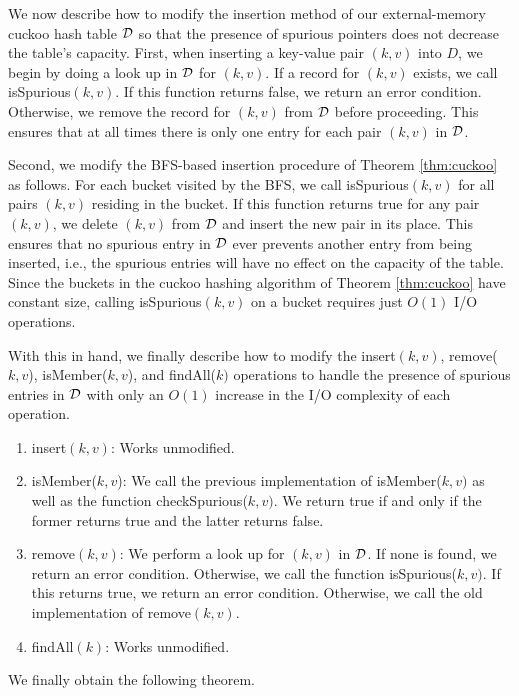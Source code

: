 \documentclass[11pt,letterpaper]{article}
\begin{document}
We now describe how to modify the insertion method of our external-memory cuckoo hash table $\cal D$ so that the presence of spurious pointers does not decrease 
the table's capacity. First, when inserting a key-value pair $(k,v)$ into $D$, we begin by doing a look up in $\cal D$ for $(k, v)$. If a record for $(k, v)$ exists, we call isSpurious$(k,v)$. If this function returns false, we return an error condition. Otherwise, we remove the record for $(k,v)$ from $\cal D$ before proceeding.   This ensures that at all times there is only one entry for each pair $(k,v)$ in $\cal D$.

Second, we modify the BFS-based insertion procedure of Theorem \ref{thm:cuckoo} as follows. For each bucket visited by the BFS, we 
call isSpurious$(k,v)$ for all pairs $(k,v)$ residing in the bucket. If this function returns true for any pair $(k,v)$, we delete $(k,v)$ from $\cal D$ and
insert the new pair in its place. This ensures that no spurious entry in $\cal D$ ever prevents another entry from
being inserted, i.e., the spurious entries will have no effect on the capacity of the table. Since the buckets in the cuckoo hashing algorithm of Theorem \ref{thm:cuckoo} have constant size, calling isSpurious$(k,v)$ on a
bucket requires just $O(1)$ I/O operations.

With this in hand, we finally describe how to modify the insert$(k,v)$, remove($k, v$), isMember($k, v$), and findAll($k)$ operations
to handle the presence of spurious entries in $\cal D$ with only an $O(1)$ increase in the I/O complexity of each operation.

\begin{enumerate}
\item
insert$(k,v)$: Works unmodified.
\item isMember($k,v$): We call the previous implementation of isMember($k,v)$ as well as the function checkSpurious($k,v)$. We return true if and only if the former
returns true and the latter returns false.
\item remove$(k,v)$:  We 
perform a look up for $(k,v)$ in $\cal D$. If none is found, we return an error condition. Otherwise, we call the function isSpurious($k,v)$. If this returns true,
we return an error condition. Otherwise, we 
call the old implementation of remove$(k,v)$. 
\item findAll$(k)$: Works unmodified.
\end{enumerate}

We finally obtain the following theorem.
\end{document}
